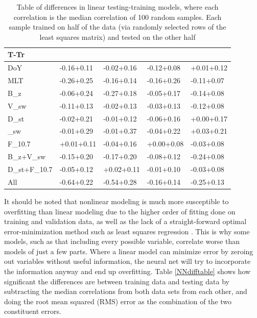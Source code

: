  \begin{table}[h]
 	\small
 	\begin{tabular}{|L|LLLL|}
 		\hline
 		T-Tr &  &  &  & \\ \hline
 		DoY & -0.16\pm+0.11 & -0.02\pm+0.16 & -0.12\pm+0.08 & +0.01\pm+0.12 \\
 		MLT & -0.26\pm+0.25 & -0.16\pm+0.14 & -0.16\pm+0.26 & -0.11\pm+0.07 \\
 		B_z & -0.06\pm+0.24 & -0.27\pm+0.18 & -0.05\pm+0.17 & -0.14\pm+0.08 \\
 		V_{sw} & -0.11\pm+0.13 & -0.02\pm+0.13 & -0.03\pm+0.13 & -0.12\pm+0.08 \\
 		D_{st} & -0.02\pm+0.21 & -0.01\pm+0.12 & -0.06\pm+0.16 & +0.00\pm+0.17 \\
 		\rho_{sw} & -0.01\pm+0.29 & -0.01\pm+0.37 & -0.04\pm+0.22 & +0.03\pm+0.21 \\
 		F_{10.7} & +0.01\pm+0.11 & -0.04\pm+0.16 & +0.00\pm+0.08 & -0.03\pm+0.08 \\
 		B_z+V_{sw} & -0.15\pm+0.20 & -0.17\pm+0.20 & -0.08\pm+0.12 & -0.24\pm+0.08 \\
 		D_{st}+F_{10.7} & -0.05\pm+0.12 & +0.02\pm+0.11 & -0.01\pm+0.10 & -0.03\pm+0.08 \\
 		All & -0.64\pm+0.22 & -0.54\pm+0.28 & -0.16\pm+0.14 & -0.25\pm+0.13 \\
 		\hline
 	\end{tabular}
 	\caption{Table of differences in linear testing-training models, where each correlation is the median correlation of 100 random samples. Each sample trained on half of the data (via randomly selected rows of the least squares matrix) and tested on the other half } 
 	\label{CCdifftable}
 \end{table}

  
 

It should be noted that nonlinear modeling is much more susceptible to overfitting than linear modeling  due to the higher order of fitting done on training and validation data, as well as the lack of a straight-forward optimal error-minimization method such as least squares regression . This is why some models, such as that including every possible variable, correlate worse than models of just a few parts. Where a linear model can minimize error by zeroing out variables without useful information, the neural net will try to incorporate the information anyway and end up overfitting. Table \ref{NNdifftable} shows how significant the differences are between training data and testing data by subtracting the median correlations from both data sets from each other, and doing the root mean squared (RMS) error as the combination of the two constituent errors.



